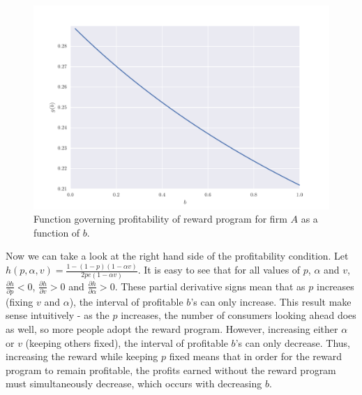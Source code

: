 \begin{figure}[h!]
\begin{centering}
\includegraphics[scale = 0.75]{./figures/b_plot.pdf}
\caption{Function governing profitability of reward program for firm $A$ as a function of $b$.}
\label{fig:b_plot}
\end{centering}
\end{figure}

Now we can take a look at the right hand side of the profitability condition. Let $h(p, \alpha, v) = \frac{1-(1-p)(1-\alpha v)}{2pe(1-\alpha v)}$. It is easy to see that for all values of $p$, $\alpha$ and $v$, $\frac{\partial h}{\partial p} < 0$, $\frac{\partial h}{\partial v} > 0$ and $\frac{\partial h}{\partial \alpha} > 0$. These partial derivative signs mean that as $p$ increases (fixing $v$ and $\alpha$), the interval of profitable $b$'s can only increase. This result make sense intuitively - as the $p$ increases, the number of consumers looking ahead does as well, so more people adopt the reward program. However, increasing either $\alpha$ or $v$ (keeping others fixed), the interval of profitable $b$'s can only decrease. Thus, increasing the reward while keeping $p$ fixed means that in order for the reward program to remain profitable, the profits earned without the reward program must simultaneously decrease, which occurs with decreasing $b$.
